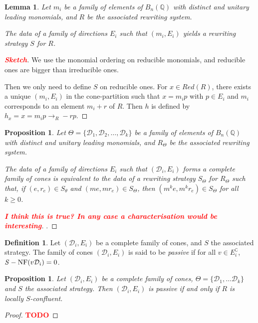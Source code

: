 \documentclass[10pt]{easychair}
\newtheorem{lemma}[theorem]{Lemma}
\newtheorem{proposition}[theorem]{Proposition}
\theoremstyle{definition}
\newtheorem{definition}[theorem]{Definition}
\newcommand\todo[1]{{\bf\textcolor{red}{#1}}}
\newcommand\D{\mathcal{D}}
\newcommand\Q{\mathbb{Q}}
\newcommand\Weyl[1]{B_{#1}(\Q)}
\newcommand\rewR{\to_R}
\DeclareMathOperator{\SNF}{{\it S}-NF}
\begin{document}
 \begin{lemma}
   Let $m_i$ be a family of elements of $\Weyl n$ with distinct and unitary
   leading monomials, and $R$ be the associated rewriting system.
   
   The data of a family of directions $E_i$ such that $(m_i,E_i)$ yields a
   rewriting strategy $S$ for $R$.
\end{lemma}
\begin{proof}[\todo{Sketch}]
  We use the monomial ordering on reducible monomials,
  and reducible ones are bigger than irreducible ones.

  Then we only need to define $S$ on reducible ones. For $x \in Red(R)$,
  there exists a unique $(m_i,E_i)$ in the cone-partition such that $x=m_i p$
  with $p \in E_i$ and $m_i$ corresponds to an element $m_i + r$ of $R$.
  Then $h$ is defined by $h_x = x = m_ip  \rewR -rp$.
\end{proof}



 \begin{proposition}
   Let $\Theta = \{ \D_1, \D_2, \ldots, \D_k\}$ be a family of elements of $\Weyl n$ with distinct and unitary
   leading monomials, and $R_\Theta$ be the associated rewriting system.
   
   The data of a family of directions $E_i$ such that $(\D_i,E_i)$ forms a complete
   family of cones is equivalent to the data of a rewriting strategy $S_\Theta$ for $R_\Theta$
   such that, if $(e,r_e) \in S_\theta$ and $(me,mr_e) \in S_\Theta$,
   then $(m^k e,m^k r_e) \in S_\Theta$ for all $k \geq 0$.
 \end{proposition}
 \begin{proof}[\todo{I think this is true? In any case a characterisation would be interesting}].

 \end{proof}

 
\begin{definition}
  Let $(\D_i,E_i)$ be a complete family of cones, and $S$ the associated strategy.
  The family of cones $(\D_i,E_i)$ is said to be \emph{passive} if for all
  $v \in E_i^\complement$, $\SNF(v\D_i) = 0$.
\end{definition}

\begin{proposition}
  Let $(\D_i,E_i)$ be a complete family of cones,
  $\Theta = \{\D_1,\ldots \D_k\} $ and $S$ the associated strategy.
  Then $(\D_i,E_i)$ is passive if and only if $R$ is locally $S$-confluent.
\end{proposition}
\begin{proof}
\todo{TODO} 
\end{proof}
\end{document}
